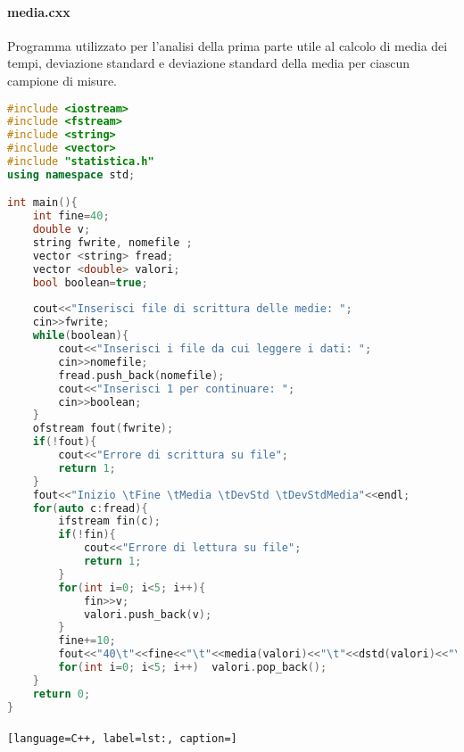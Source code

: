 \documentclass[a4paper,11pt,oneside]{article}
\begin{document}
\paragraph{media.cxx} Programma utilizzato per l'analisi della prima parte utile al calcolo di media dei tempi, deviazione standard e deviazione standard della media per ciascun campione di misure. 
\begin{lstlisting}[language=C++, label=lst:media.cxx, caption=media.cxx]
#include <iostream>
#include <fstream>
#include <string>
#include <vector>
#include "statistica.h"
using namespace std;

int main(){
	int fine=40;
	double v;
	string fwrite, nomefile ;
	vector <string> fread;
	vector <double> valori;
	bool boolean=true;
	
	cout<<"Inserisci file di scrittura delle medie: ";
	cin>>fwrite;
	while(boolean){
		cout<<"Inserisci i file da cui leggere i dati: ";
		cin>>nomefile;
		fread.push_back(nomefile);
		cout<<"Inserisci 1 per continuare: ";
		cin>>boolean;
	}
	ofstream fout(fwrite);
	if(!fout){
		cout<<"Errore di scrittura su file";
		return 1;
	}
	fout<<"Inizio \tFine \tMedia \tDevStd \tDevStdMedia"<<endl;
	for(auto c:fread){
		ifstream fin(c);
		if(!fin){
			cout<<"Errore di lettura su file";
			return 1;
		}
		for(int i=0; i<5; i++){
			fin>>v;
			valori.push_back(v);
		}
		fine+=10;
		fout<<"40\t"<<fine<<"\t"<<media(valori)<<"\t"<<dstd(valori)<<"\t"<<dstd_media(valori)<<endl;
		for(int i=0; i<5; i++)	valori.pop_back();
	}
	return 0;
}
\end{lstlisting}

\paragraph{}
\begin{lstlisting}[language=C++, label=lst:, caption=]

\end{lstlisting}
\end{document}
